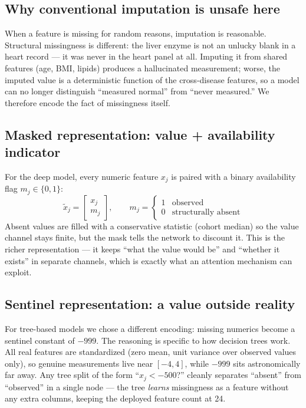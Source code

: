 \documentclass[journal]{IEEEtran}
\begin{document}
\subsection{Why conventional imputation is unsafe here}
When a feature is missing for random reasons, imputation is reasonable. Structural missingness is different: the liver enzyme is not an unlucky blank in a heart record --- it was never in the heart panel at all. Imputing it from shared features (age, BMI, lipids) produces a hallucinated measurement; worse, the imputed value is a deterministic function of the cross-disease features, so a model can no longer distinguish ``measured normal'' from ``never measured.'' We therefore encode the fact of missingness itself.

\subsection{Masked representation: value + availability indicator}
For the deep model, every numeric feature $x_j$ is paired with a binary availability flag $m_j\in\{0,1\}$:
\begin{equation}
\tilde{x}_j = \begin{bmatrix}x_j \\ m_j\end{bmatrix},\qquad
m_j = \begin{cases}1 & \text{observed}\\0 & \text{structurally absent}\end{cases}
\end{equation}
Absent values are filled with a conservative statistic (cohort median) so the value channel stays finite, but the mask tells the network to discount it. This is the richer representation --- it keeps ``what the value would be'' and ``whether it exists'' in separate channels, which is exactly what an attention mechanism can exploit.

\subsection{Sentinel representation: a value outside reality}
For tree-based models we chose a different encoding: missing numerics become a sentinel constant of $-999$. The reasoning is specific to how decision trees work. All real features are standardized (zero mean, unit variance over observed values only), so genuine measurements live near $[-4,4]$, while $-999$ sits astronomically far away. Any tree split of the form ``$x_j < -500$?'' cleanly separates ``absent'' from ``observed'' in a single node --- the tree \emph{learns} missingness as a feature without any extra columns, keeping the deployed feature count at 24.
\end{document}
